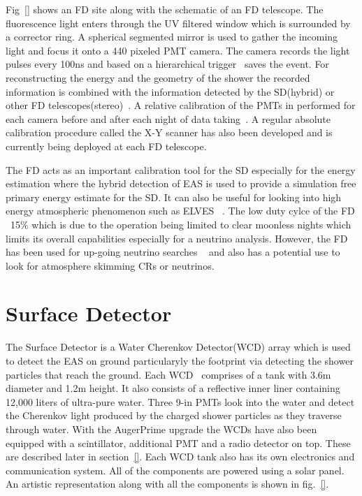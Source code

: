 Fig~\ref{} shows an FD site along with the schematic of an FD telescope. The fluorescence light enters through the UV filtered window 
which is surrounded by a corrector ring. A spherical segmented mirror is used to gather the incoming light and focus it onto a 440 pixeled PMT camera. The camera records the light pulses every 100ns and based on a hierarchical trigger~\cite{} saves the event. For reconstructing the energy and the geometry of the shower the recorded information is combined with the information detected by the SD(hybrid) or other FD telescopes(stereo)~\cite{}. A relative calibration of the PMTs in performed for each camera before and after each night of data taking~\cite{}. A regular absolute calibration procedure called the X-Y scanner has also been developed and is currently being deployed at each FD telescope. 

The FD acts as an important calibration tool for the SD especially for the energy estimation where the hybrid detection of EAS is used to provide a simulation free primary energy estimate for the SD. It can also be useful for looking into high energy atmospheric phenomenon such as ELVES ~\cite{}. The low duty cylce of the FD ~15\% which is due to the operation being limited to clear moonless nights which limits its overall capabilities especially for a neutrino analysis. However, the FD has been used for up-going neutrino searches ~\cite{} and also has a potential use to look for atmosphere skimming CRs or neutrinos.  

\section*{Surface Detector}
\label{sec:Sur_det}
The Surface Detector is a Water Cherenkov Detector(WCD) array which is used to detect the EAS on ground particularyly the footprint via detecting the shower particles that reach the ground. Each WCD~\cite{} comprises of a tank with 3.6m diameter and 1.2m height. It also consists of a reflective inner liner containing 12,000 liters of ultra-pure water. Three 9-in PMTs look into the water and detect the Cherenkov light produced by the charged shower particles as they traverse through water. With the AugerPrime upgrade the WCDs have also been equipped with a scintillator, additional PMT and a radio detector on top. These are described later in section~\ref{}. Each WCD tank also has its own electronics and communication system. All of the components are powered using a solar panel. An artistic representation along with all the components is shown in fig.~\ref{}. 

